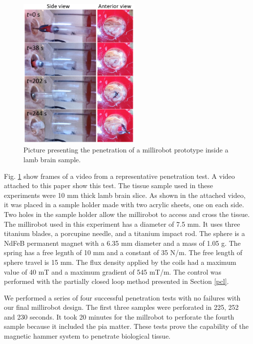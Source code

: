 \documentclass[letterpaper, 10 pt, conference]{ieeeconf}  %
\begin{document}
\begin{figure}
	\centering
  \includegraphics[width=170pt]{brain_penetration.png}
  \caption{Picture presenting the penetration of a millirobot prototype inside a lamb brain sample.}
  \label{brain_penetration}
	\vspace{-2em}
\end{figure}

Fig. \ref{brain_penetration} show frames of a video from a representative penetration test. A video attached to this paper show this test. The tissue sample used in these experiments were 10 mm thick lamb brain slice. As shown in the attached video, it was placed in a sample holder made with two acrylic sheets, one on each side. Two holes in the sample holder allow the millirobot to access and cross the tissue. The millirobot used in this experiment has a diameter of 7.5 mm. It uses three titanium blades, a porcupine needle, and a titanium impact rod. The sphere is a NdFeB permanent magnet with a 6.35 mm diameter and a mass of 1.05 g. The spring has a free legnth of 10 mm and a constant of 35 N/m. The free length of sphere travel is 15 mm. The flux density applied by the coils had a maximum value of 40 mT and a maximum gradient of 545 mT/m. The control was performed with the partially closed loop method presented in Section \ref{pcl}.\par
We performed a series of four successful penetration tests with no failures with our final millirobot design. The first three samples were perforated in 225, 252 and 230 seconds. It took 20 minutes for the millrobot to perforate the fourth sample because it included the pia matter. These tests prove the capability of the magnetic hammer system to penetrate biological tissue.
\end{document}
